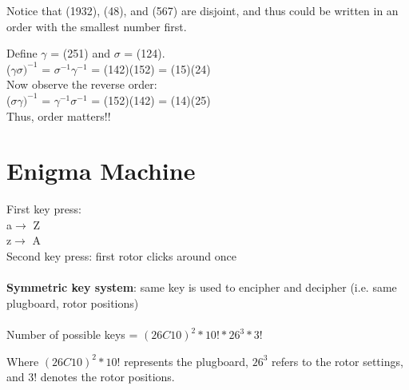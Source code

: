 Notice that (1932), (48), and (567) are disjoint, and thus could be written in an order with the smallest number first.  \begin{example} Define $\gamma$ = (251) and $\sigma$ = (124).\\ ($\gamma \sigma)^{-1}$ = $\sigma^{-1}$$\gamma^{-1}$ = (142)(152) = (15)(24) \\ Now observe the reverse order: \\ ($\sigma \gamma)^{-1}$ = $\gamma^{-1}$$\sigma^{-1}$ = (152)(142) = (14)(25) \\Thus, order matters!!
\section{Enigma Machine} First key press: \\a$\rightarrow$ Z \\z$\rightarrow$ A \\Second key press: first rotor clicks around once \\\\\textbf{ Symmetric key system}: same key is used to encipher and decipher (i.e. same plugboard, rotor positions) \\\\Number of possible keys = $(26C10)^{2}*10!*26^{3}*3!$ \\ \par Where $(26C10)^{2}*10!$ represents the plugboard, $26^{3}$ refers to the rotor settings, and $3!$ denotes the rotor positions. 

\end{example}
